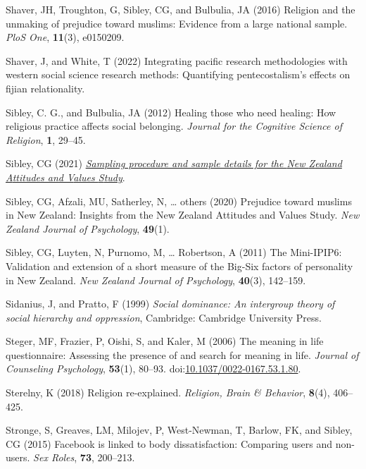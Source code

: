 \documentclass[
  single column]{article}
\newlength{\cslhangindent}
\newenvironment{CSLReferences}[2] %
 {\begin{list}{}{%
  \setlength{\itemindent}{0pt}
  \setlength{\leftmargin}{0pt}
  \setlength{\parsep}{0pt}
  \ifodd #1
   \setlength{\leftmargin}{\cslhangindent}
   \setlength{\itemindent}{-1\cslhangindent}
  \fi
  \setlength{\itemsep}{#2\baselineskip}}}
 {\end{list}}
\begin{document}
\begin{CSLReferences}{1}{0}
Shaver, JH, Troughton, G, Sibley, CG, and Bulbulia, JA (2016) Religion
and the unmaking of prejudice toward muslims: Evidence from a large
national sample. \emph{PloS One}, \textbf{11}(3), e0150209.

Shaver, J, and White, T (2022) Integrating pacific research
methodologies with western social science research methods: Quantifying
pentecostalism's effects on fijian relationality.

Sibley, C. G., and Bulbulia, JA (2012) Healing those who need healing:
How religious practice affects social belonging. \emph{Journal for the
Cognitive Science of Religion}, \textbf{1}, 29--45.

Sibley, CG (2021)
\emph{\href{https://doi.org/10.31234/osf.io/wgqvy}{Sampling procedure
and sample details for the {N}ew {Z}ealand {A}ttitudes and {V}alues
{S}tudy}}.

Sibley, CG, Afzali, MU, Satherley, N, \ldots{} others (2020) Prejudice
toward muslims in {N}ew {Z}ealand: Insights from the {N}ew {Z}ealand
{A}ttitudes and {V}alues {S}tudy. \emph{New Zealand Journal of
Psychology}, \textbf{49}(1).

Sibley, CG, Luyten, N, Purnomo, M, \ldots{} Robertson, A (2011) The
Mini-IPIP6: Validation and extension of a short measure of the Big-Six
factors of personality in {N}ew {Z}ealand. \emph{New Zealand Journal of
Psychology}, \textbf{40}(3), 142--159.

Sidanius, J, and Pratto, F (1999) \emph{Social dominance: An intergroup
theory of social hierarchy and oppression}, Cambridge: Cambridge
University Press.

Steger, MF, Frazier, P, Oishi, S, and Kaler, M (2006) The meaning in
life questionnaire: Assessing the presence of and search for meaning in
life. \emph{Journal of Counseling Psychology}, \textbf{53}(1), 80--93.
doi:\href{https://doi.org/10.1037/0022-0167.53.1.80}{10.1037/0022-0167.53.1.80}.

Sterelny, K (2018) Religion re-explained. \emph{Religion, Brain \&
Behavior}, \textbf{8}(4), 406--425.

Stronge, S, Greaves, LM, Milojev, P, West-Newman, T, Barlow, FK, and
Sibley, CG (2015) Facebook is linked to body dissatisfaction: Comparing
users and non-users. \emph{Sex Roles}, \textbf{73}, 200--213.


\end{CSLReferences}
\end{document}
